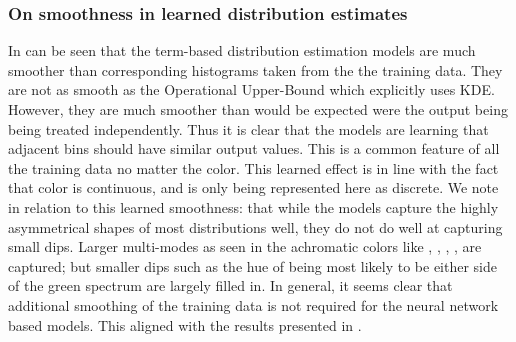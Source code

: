 \documentclass[11pt,a4paper]{article}
\begin{document}
\subsubsection{On smoothness in learned distribution estimates}\label{sec:learnedsmoothness}
In  can be seen that the term-based distribution estimation models are much smoother than corresponding histograms taken from the the training data.
They are not as smooth as the Operational Upper-Bound which explicitly uses KDE.
However, they are much smoother than would be expected were the output being being treated independently.
Thus it is clear that the models are learning that adjacent bins should have similar output values.
This is a common feature of all the training data no matter the color.
This learned effect is in line with the fact that color is continuous, and is only being represented here as discrete.
We note in relation to this learned smoothness: that while the models capture the highly asymmetrical shapes of most distributions well, they do not do well at capturing small dips.
Larger multi-modes as seen in the achromatic colors like , , , , are captured; but smaller dips such as the hue of  being most likely to be either side of the green spectrum are largely filled in.
In general, it seems clear that additional smoothing of the training data is not required for the neural network based models.
This aligned with the results presented in .




\end{document}
